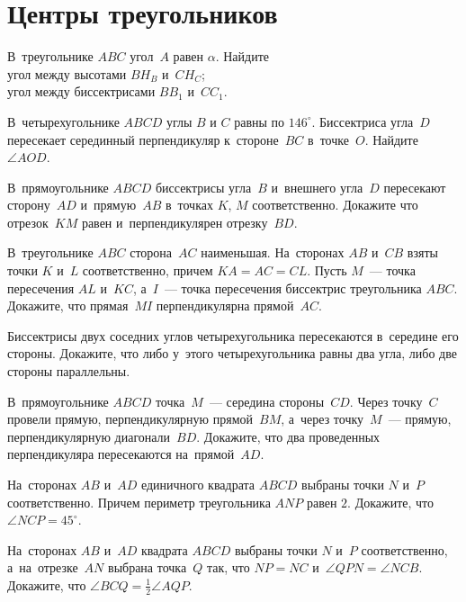 
\section*{Центры треугольников}


\begin{problems}

\item
В~треугольнике $ABC$ угол~$A$ равен $\alpha$.
Найдите
\\
\subproblem угол между высотами $B H_B$ и~$C H_C$;
\\
\subproblem угол между биссектрисами $B B_1$ и~$C C_1$.

\item
В~четырехугольнике $ABCD$ углы $B$ и $C$ равны по $146^{\circ}$.
Биссектриса угла~$D$ пересекает серединный перпендикуляр к~стороне~$BC$
в~точке~$O$.
Найдите $\angle AOD$.

\item
В~прямоугольнике $ABCD$ биссектрисы угла~$B$ и~внешнего угла~$D$ пересекают
сторону~$AD$ и~прямую~$AB$ в~точках $K$, $M$ соответственно.
Докажите что отрезок~$KM$ равен и~перпендикулярен отрезку~$BD$.


\item
В~треугольнике $ABC$ сторона~$AC$ наименьшая.
На~сторонах $AB$ и~$CB$ взяты точки $K$ и~$L$ соответственно, причем
$KA = AC = CL$.
Пусть $M$~--- точка пересечения $AL$ и~$KC$, а~$I$~--- точка пересечения
биссектрис треугольника $ABC$.
Докажите, что прямая~$MI$ перпендикулярна прямой~$AC$.

\item
Биссектрисы двух соседних углов четырехугольника пересекаются в~середине его
стороны.
Докажите, что либо у~этого четырехугольника равны два угла, либо две стороны
параллельны.

\item
В~прямоугольнике $ABCD$ точка~$M$~--- середина стороны~$CD$.
Через точку~$C$ провели прямую, перпендикулярную прямой~$BM$, а~через
точку~$M$~--- прямую, перпендикулярную диагонали~$BD$.
Докажите, что два проведенных перпендикуляра пересекаются на~прямой~$AD$.

\item
На~сторонах $AB$ и~$AD$ единичного квадрата $ABCD$ выбраны точки $N$ и~$P$
соответственно.
Причем периметр треугольника $ANP$ равен $2$.
Докажите, что $\angle NCP = 45^{\circ}$.

\item
На~сторонах $AB$ и~$AD$ квадрата $ABCD$ выбраны точки $N$ и~$P$ соответственно,
а~на~отрезке~$AN$ выбрана точка~$Q$ так, что $NP = NC$
и~$\angle QPN = \angle NCB$.
Докажите, что $\angle BCQ = \frac{1}{2} \angle AQP$.

\end{problems}

